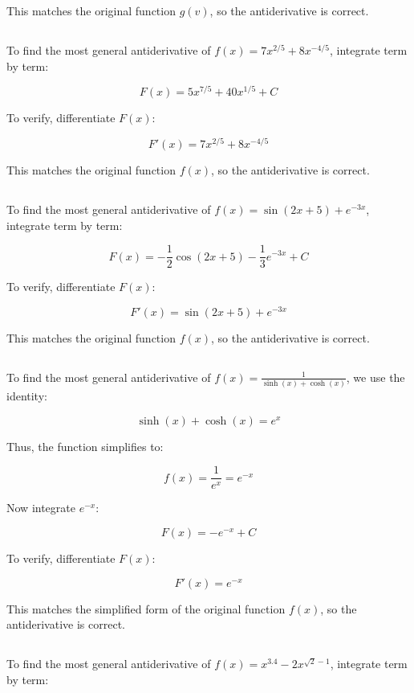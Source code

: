 \documentclass{article}
\begin{document}
This matches the original function \( g(v) \), so the antiderivative is correct.
\subsection{}
To find the most general antiderivative of \( f(x) = 7x^{2/5} + 8x^{-4/5} \), integrate term by term:

\[
F(x) = 5x^{7/5} + 40x^{1/5} + C
\]

To verify, differentiate \( F(x) \):

\[
F'(x) = 7x^{2/5} + 8x^{-4/5}
\]

This matches the original function \( f(x) \), so the antiderivative is correct.
\subsection{}
To find the most general antiderivative of \( f(x) = \sin(2x + 5) + e^{-3x} \), integrate term by term:

\[
F(x) = -\frac{1}{2}\cos(2x + 5) - \frac{1}{3}e^{-3x} + C
\]

To verify, differentiate \( F(x) \):

\[
F'(x) = \sin(2x + 5) + e^{-3x}
\]

This matches the original function \( f(x) \), so the antiderivative is correct.
\subsection{}
To find the most general antiderivative of \( f(x) = \frac{1}{\sinh(x) + \cosh(x)} \), we use the identity:

\[
\sinh(x) + \cosh(x) = e^x
\]

Thus, the function simplifies to:

\[
f(x) = \frac{1}{e^x} = e^{-x}
\]

Now integrate \( e^{-x} \):

\[
F(x) = -e^{-x} + C
\]

To verify, differentiate \( F(x) \):

\[
F'(x) = e^{-x}
\]

This matches the simplified form of the original function \( f(x) \), so the antiderivative is correct.
\subsection{}
To find the most general antiderivative of \( f(x) = x^{3.4} - 2x^{\sqrt{2} - 1} \), integrate term by term:
\end{document}
